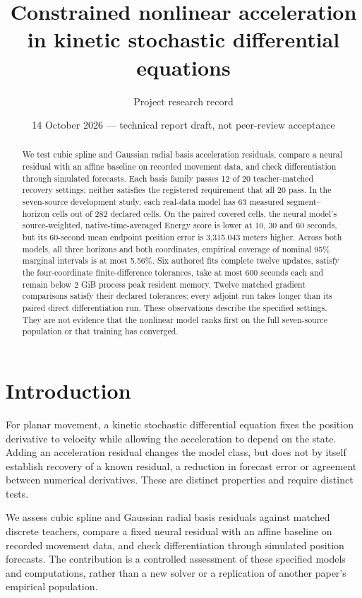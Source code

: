 \documentclass[11pt]{article}
\title{Constrained nonlinear acceleration\\in kinetic stochastic differential equations}
\author{Project research record}
\date{14 October 2026 --- technical report draft, not peer-review acceptance}
\begin{document}
\maketitle
\begin{abstract}
We test cubic spline and Gaussian radial basis acceleration residuals, compare a neural residual with an affine baseline on recorded movement data, and check differentiation through simulated forecasts. Each basis family passes 12 of 20 teacher-matched recovery settings; neither satisfies the registered requirement that all 20 pass. In the seven-source development study, each real-data model has 63 measured segment--horizon cells out of 282 declared cells. On the paired covered cells, the neural model's source-weighted, native-time-averaged Energy score is lower at 10, 30 and 60 seconds, but its 60-second mean endpoint position error is 3,315.043 meters higher. Across both models, all three horizons and both coordinates, empirical coverage of nominal 95\% marginal intervals is at most 5.56\%. Six authored fits complete twelve updates, satisfy the four-coordinate finite-difference tolerances, take at most 600 seconds each and remain below 2 GiB process peak resident memory. Twelve matched gradient comparisons satisfy their declared tolerances; every adjoint run takes longer than its paired direct differentiation run. These observations describe the specified settings. They are not evidence that the nonlinear model ranks first on the full seven-source population or that training has converged.
\end{abstract}

\section{Introduction}\label{sec:introduction}
For planar movement, a kinetic stochastic differential equation fixes the position derivative to velocity while allowing the acceleration to depend on the state. Adding an acceleration residual changes the model class, but does not by itself establish recovery of a known residual, a reduction in forecast error or agreement between numerical derivatives. These are distinct properties and require distinct tests.

We assess cubic spline and Gaussian radial basis residuals against matched discrete teachers, compare a fixed neural residual with an affine baseline on recorded movement data, and check differentiation through simulated position forecasts. The contribution is a controlled assessment of these specified models and computations, rather than a new solver or a replication of another paper's empirical population.
\end{document}
